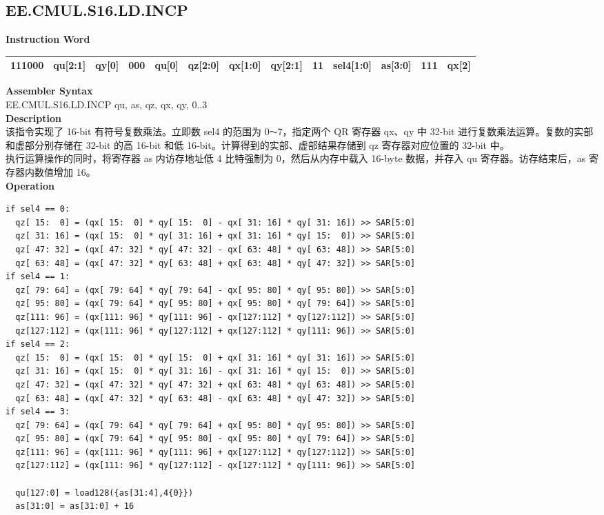 \clearpage
\subsection{EE.CMUL.S16.LD.INCP}\label{instruction:EECMULS16LDINCP}
\setlength\tabcolsep{6pt}
\textbf{Instruction Word} \\
\begin{tabular}{|c|c|c|c|c|c|c|c|c|c|c|c|c|}
	\hline
	111000 & qu[2:1] & qy[0] & 000 & qu[0] & qz[2:0] & qx[1:0] & qy[2:1] & 11 & sel4[1:0] & as[3:0] & 111 & qx[2] \\
	\hline
\end{tabular}

\textbf{Assembler Syntax} \\
EE.CMUL.S16.LD.INCP qu, as, qz, qx, qy, 0..3 \\
\textbf{Description} \\
该指令实现了 16-bit 有符号复数乘法。立即数 sel4 的范围为 0\verb+～+7，指定两个 QR 寄存器 qx、qy 中 32-bit 进行复数乘法运算。复数的实部和虚部分别存储在 32-bit 的高 16-bit 和低 16-bit。计算得到的实部、虚部结果存储到 qz 寄存器对应位置的 32-bit 中。\\ 执行运算操作的同时，将寄存器 as 内访存地址低 4 比特强制为 0，然后从内存中载入 16-byte 数据，并存入 qu 寄存器。访存结束后，as 寄存器内数值增加 16。\\
\textbf{Operation}
\begin{lstlisting}
if sel4 == 0:
  qz[ 15:  0] = (qx[ 15:  0] * qy[ 15:  0] - qx[ 31: 16] * qy[ 31: 16]) >> SAR[5:0]
  qz[ 31: 16] = (qx[ 15:  0] * qy[ 31: 16] + qx[ 31: 16] * qy[ 15:  0]) >> SAR[5:0]
  qz[ 47: 32] = (qx[ 47: 32] * qy[ 47: 32] - qx[ 63: 48] * qy[ 63: 48]) >> SAR[5:0]
  qz[ 63: 48] = (qx[ 47: 32] * qy[ 63: 48] + qx[ 63: 48] * qy[ 47: 32]) >> SAR[5:0]
if sel4 == 1:
  qz[ 79: 64] = (qx[ 79: 64] * qy[ 79: 64] - qx[ 95: 80] * qy[ 95: 80]) >> SAR[5:0]
  qz[ 95: 80] = (qx[ 79: 64] * qy[ 95: 80] + qx[ 95: 80] * qy[ 79: 64]) >> SAR[5:0]
  qz[111: 96] = (qx[111: 96] * qy[111: 96] - qx[127:112] * qy[127:112]) >> SAR[5:0]
  qz[127:112] = (qx[111: 96] * qy[127:112] + qx[127:112] * qy[111: 96]) >> SAR[5:0]
if sel4 == 2:
  qz[ 15:  0] = (qx[ 15:  0] * qy[ 15:  0] + qx[ 31: 16] * qy[ 31: 16]) >> SAR[5:0]
  qz[ 31: 16] = (qx[ 15:  0] * qy[ 31: 16] - qx[ 31: 16] * qy[ 15:  0]) >> SAR[5:0]
  qz[ 47: 32] = (qx[ 47: 32] * qy[ 47: 32] + qx[ 63: 48] * qy[ 63: 48]) >> SAR[5:0]
  qz[ 63: 48] = (qx[ 47: 32] * qy[ 63: 48] - qx[ 63: 48] * qy[ 47: 32]) >> SAR[5:0]
if sel4 == 3:
  qz[ 79: 64] = (qx[ 79: 64] * qy[ 79: 64] + qx[ 95: 80] * qy[ 95: 80]) >> SAR[5:0]
  qz[ 95: 80] = (qx[ 79: 64] * qy[ 95: 80] - qx[ 95: 80] * qy[ 79: 64]) >> SAR[5:0]
  qz[111: 96] = (qx[111: 96] * qy[111: 96] + qx[127:112] * qy[127:112]) >> SAR[5:0]
  qz[127:112] = (qx[111: 96] * qy[127:112] - qx[127:112] * qy[111: 96]) >> SAR[5:0]

  qu[127:0] = load128({as[31:4],4{0}})
  as[31:0] = as[31:0] + 16
\end{lstlisting}


